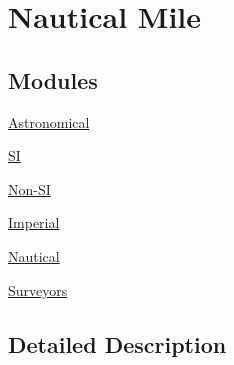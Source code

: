 \hypertarget{group___e_g_x_math-_conversions-_length_conversions-_nautical-_nautical_mile}{}\section{Nautical Mile}
\label{group___e_g_x_math-_conversions-_length_conversions-_nautical-_nautical_mile}
\subsection*{Modules}
\begin{DoxyCompactItemize}
\item 
\mbox{\hyperlink{group___e_g_x_math-_conversions-_length_conversions-_nautical-_nautical_mile-_astronomical}{Astronomical}}
\item 
\mbox{\hyperlink{group___e_g_x_math-_conversions-_length_conversions-_nautical-_nautical_mile-_s_i}{SI}}
\item 
\mbox{\hyperlink{group___e_g_x_math-_conversions-_length_conversions-_nautical-_nautical_mile-_non-_s_i}{Non-\/\+SI}}
\item 
\mbox{\hyperlink{group___e_g_x_math-_conversions-_length_conversions-_nautical-_nautical_mile-_imperial}{Imperial}}
\item 
\mbox{\hyperlink{group___e_g_x_math-_conversions-_length_conversions-_nautical-_nautical_mile-_nautical}{Nautical}}
\item 
\mbox{\hyperlink{group___e_g_x_math-_conversions-_length_conversions-_nautical-_nautical_mile-_surveyors}{Surveyors}}
\end{DoxyCompactItemize}


\subsection{Detailed Description}
